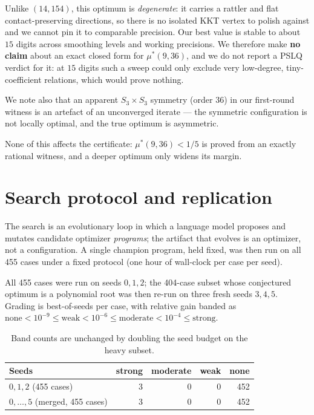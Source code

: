 \documentclass[11pt,a4paper]{article}
\newcommand{\mustar}{\mu^{*}}
\begin{document}
Unlike $(14,154)$, this optimum is \emph{degenerate}: it carries a rattler and flat
contact-preserving directions, so there is no isolated KKT vertex to polish against
and we cannot pin it to comparable precision. Our best value is stable to about $15$
digits across smoothing levels and working precisions. We therefore make \textbf{no
claim} about an exact closed form for $\mustar(9,36)$, and we do not report a PSLQ
verdict for it: at $15$ digits such a sweep could only exclude very low-degree,
tiny-coefficient relations, which would prove nothing.

We note also that an apparent $S_3\times S_3$ symmetry (order $36$) in our first-round
witness is an artefact of an unconverged iterate --- the symmetric configuration is
not locally optimal, and the true optimum is asymmetric.

None of this affects the certificate: $\mustar(9,36)<1/5$ is proved from an exactly
rational witness, and a deeper optimum only widens its margin.

\section{Search protocol and replication}

The search is an evolutionary loop in which a language model proposes and mutates
candidate optimizer \emph{programs}; the artifact that evolves is an optimizer, not a
configuration. A single champion program, held fixed, was then run on all 455 cases
under a fixed protocol (one hour of wall-clock per case per seed).

All 455 cases were run on seeds $0,1,2$; the 404-case subset whose conjectured optimum
is a polynomial root was then re-run on three fresh seeds $3,4,5$. Grading is
best-of-seeds per case, with relative gain banded as
$\text{none} < 10^{-9} \le \text{weak} < 10^{-6} \le \text{moderate} < 10^{-4} \le
\text{strong}$.

\begin{table}[H]
\centering
\begin{tabular}{lrrrr}
\toprule
Seeds & strong & moderate & weak & none \\
\midrule
$0,1,2$ (455 cases)          & 3 & 0 & 0 & 452 \\
$0,\dots,5$ (merged, 455 cases) & 3 & 0 & 0 & 452 \\
\bottomrule
\end{tabular}
\caption{Band counts are unchanged by doubling the seed budget on the heavy subset.}
\end{table}
\end{document}
